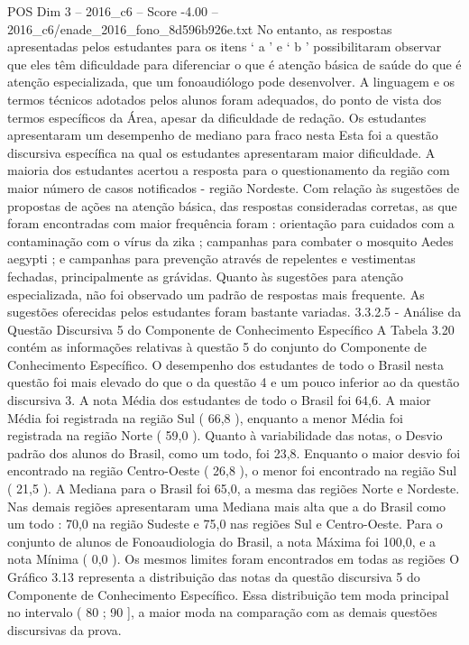 \begin{textsample}{POS Dim 3 – 2016\_c6 – Score -4.00 – 2016\_c6/enade\_2016\_fono\_8d596b926e.txt}
No entanto, as respostas apresentadas pelos estudantes para os itens ‘ a ’ e ‘ b ’ possibilitaram observar que eles têm dificuldade para diferenciar o que é atenção básica de saúde do que é atenção especializada, que um fonoaudiólogo pode desenvolver.
A linguagem e os termos técnicos adotados pelos alunos foram adequados, do ponto de vista dos termos específicos da Área, apesar da dificuldade de redação.
Os estudantes apresentaram um desempenho de mediano para fraco nesta Esta foi a questão discursiva específica na qual os estudantes apresentaram maior dificuldade.
A maioria dos estudantes acertou a resposta para o questionamento da região com maior número de casos notificados - região Nordeste.
Com relação às sugestões de propostas de ações na atenção básica, das respostas consideradas corretas, as que foram encontradas com maior frequência foram : orientação para cuidados com a contaminação com o vírus da zika ; campanhas para combater o mosquito Aedes aegypti ; e campanhas para prevenção através de repelentes e vestimentas fechadas, principalmente as grávidas.
Quanto às sugestões para atenção especializada, não foi observado um padrão de respostas mais frequente.
As sugestões oferecidas pelos estudantes foram bastante variadas. 3.3.2.5 - Análise da Questão Discursiva 5 do Componente de Conhecimento Específico A Tabela 3.20 contém as informações relativas à questão 5 do conjunto do Componente de Conhecimento Específico.
O desempenho dos estudantes de todo o Brasil nesta questão foi mais elevado do que o da questão 4 e um pouco inferior ao da questão discursiva 3.
A nota Média dos estudantes de todo o Brasil foi 64,6.
A maior Média foi registrada na região Sul ( 66,8 ), enquanto a menor Média foi registrada na região Norte ( 59,0 ).
Quanto à variabilidade das notas, o Desvio padrão dos alunos do Brasil, como um todo, foi 23,8.
Enquanto o maior desvio foi encontrado na região Centro-Oeste ( 26,8 ), o menor foi encontrado na região Sul ( 21,5 ).
A Mediana para o Brasil foi 65,0, a mesma das regiões Norte e Nordeste.
Nas demais regiões apresentaram uma Mediana mais alta que a do Brasil como um todo : 70,0 na região Sudeste e 75,0 nas regiões Sul e Centro-Oeste.
Para o conjunto de alunos de Fonoaudiologia do Brasil, a nota Máxima foi 100,0, e a nota Mínima ( 0,0 ).
Os mesmos limites foram encontrados em todas as regiões O Gráfico 3.13 representa a distribuição das notas da questão discursiva 5 do Componente de Conhecimento Específico.
Essa distribuição tem moda principal no intervalo ( 80 ; 90 ], a maior moda na comparação com as demais questões discursivas da prova.

\end{textsample}
